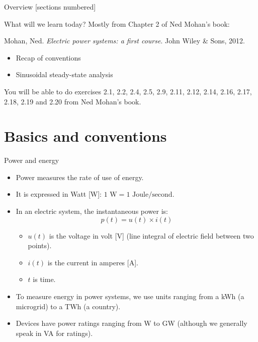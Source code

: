 \titleframe

\begin{frame}{Overview}
  [sections numbered]
  \tableofcontents[hideallsubsections]
\end{frame}

\begin{frame}{What will we learn today?}
  Mostly from Chapter 2 of Ned Mohan's book:
  \begin{center}
    Mohan, Ned. \textit{Electric power systems: a first course}. John Wiley \& Sons, 2012.
  \end{center}

  \begin{itemize}
    \item Recap of conventions
    \item Sinusoidal steady-state analysis
  \end{itemize}
  \vspace{0.3cm}
  You will be able to do exercises 2.1, 2.2, 2.4, 2.5, 2.9, 2.11, 2.12, 2.14, 2.16, 2.17, 2.18, 2.19 and 2.20 from Ned Mohan's book.
\end{frame}

\section{Basics and conventions}

\begin{frame}{Power and energy}
  \begin{itemize}
    \item Power measures the rate of use of energy.
    \item It is expressed in Watt [W]: $1\text{ W} = 1\text{ Joule/second}$.
    \item In an electric system, the instantaneous power is:
      $$p(t) = u(t) \times i(t)$$
      \begin{itemize}
        \item $u(t)$ is the voltage in volt [V] (line integral of electric field between two points).
        \item $i(t)$ is the current in amperes [A].
        \item $t$ is time.
      \end{itemize}
    \item To measure energy in power systems, we use units ranging from a kWh (a microgrid) to a TWh (a country).
    \item Devices have power ratings ranging from W to GW (although we generally speak in VA for ratings).
  \end{itemize}
\end{frame}

